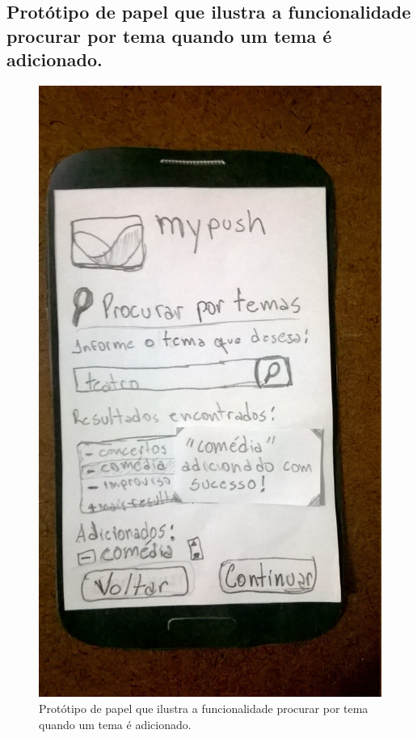 \begin{apendicesenv}
    \pagebreak
    \section*{Protótipo de papel que ilustra a funcionalidade procurar por tema quando um tema é adicionado.}
    
      \begin{figure}[!htbp]
	\centering
	\includegraphics[scale=0.32]{editaveis/figuras/prototipo_papel_v1/tema_adicionado}
	\caption{Protótipo de papel que ilustra a funcionalidade procurar por tema quando um tema é adicionado.}
	\label{tema_adicionado_v1}
      \end{figure}
	

\end{apendicesenv}
